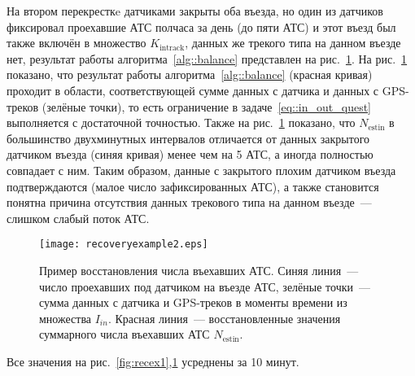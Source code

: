 На втором перекресткe датчиками закрыты оба въезда, но один из датчиков фиксировал проехавшие АТС полчаса за день (до пяти АТС) и этот въезд был также включён в множество $K_\text{intrack}$, данных же трекого типа на данном въезде нет, результат работы алгоритма~\ref{alg::balance} представлен на рис.~\ref{fig:recex2}.
На рис.~\ref{fig:recex2} показано, что результат работы алгоритма~\ref{alg::balance} (красная кривая) проходит в области, соответствующей сумме данных с датчика и данных с GPS-треков (зелёные точки), то есть ограничение в задаче~\eqref{eq::in_out_quest} выполняется с достаточной точностью.
Также на рис.~\ref{fig:recex2} показано, что $N_\text{estin}$ в большинство двухминутных интервалов отличается от данных закрытого датчиком въезда (синяя кривая) менее чем на 5 АТС, а иногда полностью совпадает с ним.
Таким образом, данные с закрытого плохим датчиком въезда подтверждаются (малое число зафиксированных АТС), а также становится понятна причина отсутствия данных трекового типа на данном въезде~--- слишком слабый поток АТС.
\begin{figure}[!ht]
\begin{center}
\texttt{[image: recoveryexample2.eps]}
\caption{Пример восстановления числа въехавших АТС. Синяя линия~--- число проехавших под датчиком на въезде АТС, зелёные точки~--- сумма данных с датчика и GPS-треков в моменты времени из множества $I_{in}$. Красная линия~--- восстановленные значения суммарного числа въехавших АТС $N_\text{estin}$.}
\label{fig:recex2}
\end{center}
\end{figure}
Все значения на рис.~\ref{fig:recex1},\ref{fig:recex2} усреднены за 10 минут.

\FloatBarrier
